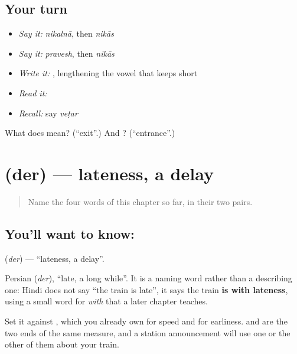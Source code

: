 \subsection*{Your turn}
\begin{itemize}
\raggedright
  \item \emph{Say it:} \emph{nikalnā}, then \emph{nikās}
  \item \emph{Say it:} \emph{pravesh}, then \emph{nikās}
  \item \emph{Write it:} , lengthening the vowel that  keeps short
  \item \emph{Read it:} \textbf{}
  \item \emph{Recall:} say \emph{veṭar}
\end{itemize}

\begin{tcolorbox}[breakable,colback=teal!4,colframe=teal!35!black,title={Before you move on}]
What does  mean? (\textquotedblleft{}exit\textquotedblright{}.) And ? (\textquotedblleft{}entrance\textquotedblright{}.)
\end{tcolorbox}
\section[\texorpdfstring{\hi{देर} (der)}{देर (der)}]{ (der) — lateness, a delay}

\label{lesson:HI-C74-late}



\begin{quote}
Name the four words of this chapter so far, in their two pairs.
\end{quote}

\subsection*{You'll want to know: }
\textbf{} (\emph{der}) — \textquotedblleft{}lateness, a delay\textquotedblright{}.

Persian  (\emph{der}), \textquotedblleft{}late, a long while\textquotedblright{}. It is a naming word rather than a describing one: Hindi does not say \textquotedblleft{}the train is late\textquotedblright{}, it says the train \textbf{is with lateness}, using a small word for \emph{with} that a later chapter teaches.

Set it against \textbf{}, which you already own for speed and for earliness.  and  are the two ends of the same measure, and a station announcement will use one or the other of them about your train.

